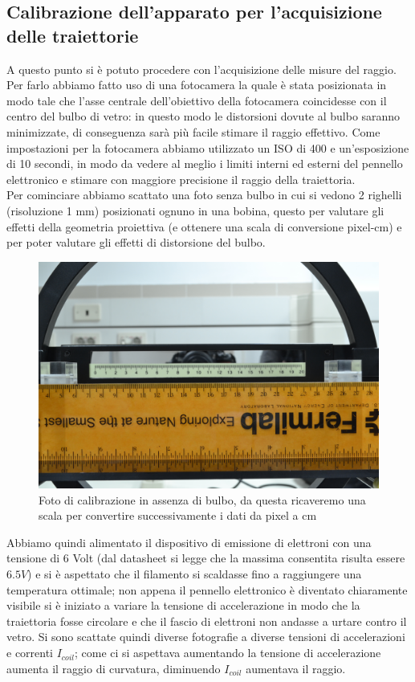 \documentclass[10pt, a4paper, italian]{article}
\begin{document}
\subsection{Calibrazione dell'apparato per l'acquisizione delle traiettorie}

A questo punto si è potuto procedere con l'acquisizione delle misure del raggio.
Per farlo abbiamo fatto uso di una fotocamera la quale è stata posizionata in modo tale che l'asse centrale dell'obiettivo della fotocamera coincidesse con il centro del bulbo di vetro: in questo modo le distorsioni dovute al bulbo saranno minimizzate, di conseguenza sarà più facile stimare il raggio effettivo.
Come impostazioni per la fotocamera abbiamo utilizzato un ISO di 400 e un'esposizione di 10 secondi, in modo da vedere al meglio i limiti interni ed esterni del pennello elettronico e stimare con maggiore precisione il raggio della traiettoria.\\
Per cominciare abbiamo scattato una foto senza bulbo in cui si vedono 2 righelli (risoluzione 1 mm) posizionati ognuno in una bobina, questo per valutare gli effetti della geometria proiettiva (e ottenere una scala di conversione pixel-cm) e per poter valutare gli effetti di distorsione del bulbo.
\begin{figure}
\includegraphics[width=\textwidth]{cal1}
\caption{Foto di calibrazione in assenza di bulbo, da questa ricaveremo una scala per convertire successivamente i dati da pixel a cm}
\end{figure}
Abbiamo quindi alimentato il dispositivo di emissione di elettroni con una tensione di 6 Volt (dal datasheet si legge che la massima consentita risulta essere $6.5 V$) e si è aspettato che il filamento si scaldasse fino a raggiungere una temperatura ottimale; non appena il pennello elettronico è diventato chiaramente visibile si è iniziato a variare la tensione di accelerazione in modo che la traiettoria fosse circolare e che il fascio di elettroni non andasse a urtare contro il vetro.
Si sono scattate quindi diverse fotografie a diverse tensioni di accelerazioni e correnti $I_{coil}$; come ci si aspettava aumentando la tensione di accelerazione aumenta il raggio di curvatura, diminuendo $I_{coil}$ aumentava il raggio.
\end{document}
